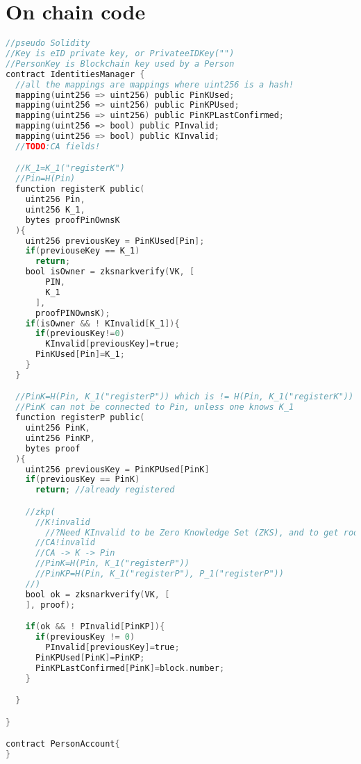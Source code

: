 \documentclass{article}
\begin{document}
\section{On chain code}
\begin{lstlisting}[language=C, frame=single, style=b]
//pseudo Solidity
//Key is eID private key, or PrivateeIDKey("")
//PersonKey is Blockchain key used by a Person
contract IdentitiesManager {
  //all the mappings are mappings where uint256 is a hash!
  mapping(uint256 => uint256) public PinKUsed;
  mapping(uint256 => uint256) public PinKPUsed;
  mapping(uint256 => uint256) public PinKPLastConfirmed;
  mapping(uint256 => bool) public PInvalid;
  mapping(uint256 => bool) public KInvalid;
  //TODO:CA fields!

  //K_1=K_1("registerK")
  //Pin=H(Pin)
  function registerK public(
    uint256 Pin,
    uint256 K_1,
    bytes proofPinOwnsK
  ){
    uint256 previousKey = PinKUsed[Pin];
    if(previouseKey == K_1)
      return;
    bool isOwner = zksnarkverify(VK, [
        PIN, 
        K_1
      ],
      proofPINOwnsK);
    if(isOwner && ! KInvalid[K_1]){
      if(previousKey!=0)
        KInvalid[previousKey]=true;
      PinKUsed[Pin]=K_1;
    }
  }

  //PinK=H(Pin, K_1("registerP")) which is != H(Pin, K_1("registerK"))
  //PinK can not be connected to Pin, unless one knows K_1
  function registerP public(
    uint256 PinK,
    uint256 PinKP,
    bytes proof
  ){
    uint256 previousKey = PinKPUsed[PinK]
    if(previousKey == PinK)
      return; //already registered

    //zkp(
      //K!invalid
        //?Need KInvalid to be Zero Knowledge Set (ZKS), and to get roots
      //CA!invalid
      //CA -> K -> Pin
      //PinK=H(Pin, K_1("registerP"))
      //PinKP=H(Pin, K_1("registerP"), P_1("registerP"))
    //)
    bool ok = zksnarkverify(VK, [
    ], proof);

    if(ok && ! PInvalid[PinKP]){
      if(previousKey != 0)
        PInvalid[previousKey]=true;
      PinKPUsed[PinK]=PinKP;
      PinKPLastConfirmed[PinK]=block.number;
    }

  }

}

contract PersonAccount{
}
\end{lstlisting}

\newpage
\end{document}
